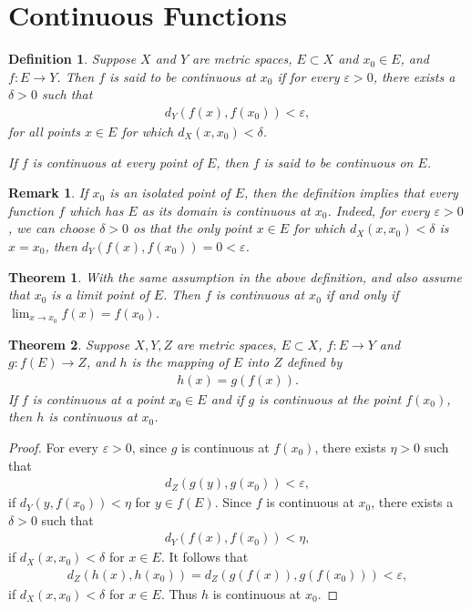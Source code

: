 \documentclass[10pt]{book}
\newtheorem{definition}{Definition}[chapter]
\newtheorem{theorem}{Theorem}[chapter]
\newtheorem{remark}{Remark}[chapter]
\theoremstyle{definition}
\numberwithin{equation}{chapter}
\begin{document}
\medskip



\section{Continuous Functions}

\begin{definition}
Suppose $X$ and $Y$ are metric spaces, $E \subset X$ and $x_0 \in E$, and $f: E \to Y$. Then $f$ is said to be continuous at $x_0$ if for every $\varepsilon > 0$, there exists a $\delta > 0$ such that 
\begin{align*}
    d_Y(f(x),f(x_0)) < \varepsilon,
\end{align*}
for all points $x \in E$ for which $d_X(x,x_0) < \delta$. 

If $f$ is continuous at every point of $E$, then $f$ is said to be continuous on $E$.
\end{definition}

\begin{remark}
If $x_0$ is an isolated point of $E$, then the definition implies that every function $f$ which has $E$ as its domain is continuous at $x_0$. Indeed, for every $\varepsilon > 0$, we can choose $\delta > 0$ os that the only point $x \in E$ for which $d_X(x,x_0) < \delta$ is $x = x_0$, then $d_Y(f(x),f(x_0)) = 0 < \varepsilon$.
\end{remark}

\medskip

\begin{theorem}
With the same assumption in the above definition, and also assume that $x_0$ is a limit point of $E$. Then $f$ is continuous at $x_0$ if and only if $\lim_{x\to x_0} f(x) = f(x_0)$.
\end{theorem}

\medskip

\begin{theorem}
Suppose $X, Y, Z$ are metric spaces, $E \subset X$, $f: E \to Y$ and $g: f(E) \to Z$, and $h$ is the mapping of $E$ into $Z$ defined by
\begin{align*}
    h(x) = g(f(x)).
\end{align*}
If $f$ is continuous at a point $x_0 \in E$ and if $g$ is continuous at the point $f(x_0)$, then $h$ is continuous at $x_0$.
\end{theorem}
\begin{proof}
For every $\varepsilon > 0$, since $g$ is continuous at $f(x_0)$, there exists $\eta > 0$ such that 
\begin{align*}
    d_Z(g(y),g(x_0)) < \varepsilon,
\end{align*}
if $d_Y(y,f(x_0)) < \eta$ for $y \in f(E)$. Since $f$ is continuous at $x_0$, there exists a $\delta > 0$ such that
\begin{align*}
    d_Y(f(x),f(x_0)) < \eta,
\end{align*}
if $d_X(x,x_0) < \delta$ for $x \in E$. It follows that
\begin{align*}
    d_Z(h(x),h(x_0)) = d_Z(g(f(x)), g(f(x_0))) < \varepsilon,
\end{align*}
if $d_X(x,x_0) < \delta$ for $x \in E$. Thus $h$ is continuous at $x_0$.
\end{proof}
\end{document}
